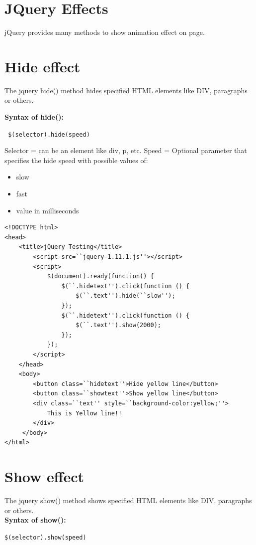 \documentclass[11pt,a4paper]{article}
\author{TalentSprint}
\date{}
\begin{document}
\section*{JQuery Effects}
jQuery provides many methods to show animation effect on page.
\section*{Hide effect}
The jquery hide() method hides specified HTML elements like DIV, paragraphs or others.

\textbf{Syntax of hide():}

\texttt{
\$(selector).hide(speed) 
}

Selector = can be an element like div, p, etc.
Speed = Optional parameter that specifies the hide speed with possible values of:
\begin{itemize}
 \item slow
 \item fast
 \item value in milliseconds
\end{itemize}
\begin{lstlisting}
<!DOCTYPE html>
<head>
    <title>jQuery Testing</title>
        <script src=``jquery-1.11.1.js''></script>
        <script>
            $(document).ready(function() {
                $(``.hidetext'').click(function () {
                    $(``.text'').hide(``slow'');
                });
                $(``.hidetext'').click(function () {
                    $(``.text'').show(2000);
                });
            });
        </script>
    </head>
    <body>
        <button class=``hidetext''>Hide yellow line</button>
        <button class=``showtext''>Show yellow line</button>
        <div class=``text'' style=``background-color:yellow;''>
            This is Yellow line!!
        </div>
     </body>
</html>
\end{lstlisting}
\section*{Show effect}
The jquery show() method shows specified HTML elements like DIV, paragraphs or others.\\
\textbf{Syntax of show():}

\texttt{\$(selector).show(speed) }
\end{document}
